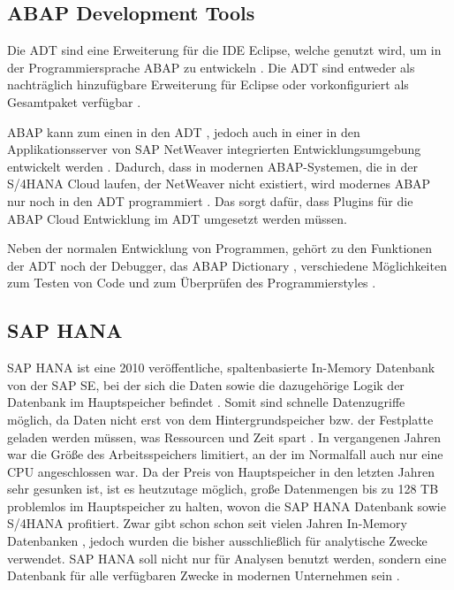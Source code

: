 \subsection{ABAP Development Tools}
Die \ac{ADT} sind eine Erweiterung für die \ac{IDE} Eclipse, welche genutzt wird, um in der Programmiersprache ABAP zu entwickeln \cite[S. 21]{sap_installing_2022}. Die \ac{ADT} sind entweder als nachträglich hinzufügbare Erweiterung für Eclipse oder vorkonfiguriert als Gesamtpaket verfügbar \cite{sap_sap_nodate}. 

\ac{ABAP} kann zum einen in den \ac{ADT} \cite[S. 1ff.]{pegiel_abap_2021}, jedoch auch in einer in den Applikationsserver von SAP NetWeaver integrierten Entwicklungsumgebung entwickelt werden \cite[S. 26]{keller_abap_2006} \cite{sap_development_nodate}. Dadurch, dass in modernen ABAP-Systemen, die in der S/4HANA Cloud laufen, der NetWeaver nicht existiert, wird modernes ABAP nur noch in den \ac{ADT} programmiert \cite{sap_abap_nodate-2}. Das sorgt dafür, dass Plugins für die ABAP Cloud Entwicklung im ADT umgesetzt werden müssen. 

Neben der normalen Entwicklung von Programmen, gehört zu den Funktionen der \ac{ADT} noch der Debugger, das ABAP Dictionary \cite[S. 1/2-1/6]{sap-documentation_abap4_1996-1}, verschiedene Möglichkeiten zum Testen von Code \cite[S. 89ff.]{pegiel_abap_2021} \cite{sap_abap_nodate-1} und zum Überprüfen des Programmierstyles \cite[S. 357ff.]{blumenthal_abap_2005}. 

\subsection{SAP HANA}
SAP HANA ist eine 2010 veröffentliche, spaltenbasierte In-Memory Datenbank von der SAP SE, bei der sich die Daten sowie die dazugehörige Logik der Datenbank im Hauptspeicher befindet \cite[S. 5 ff.]{sap_ha100_2022}. Somit sind schnelle Datenzugriffe möglich, da Daten nicht erst von dem Hintergrundspeicher bzw. der Festplatte geladen werden müssen, was Ressourcen und Zeit spart \cite[S. 7 ff.]{plattner_course_2013}. In vergangenen Jahren war die Größe des Arbeitsspeichers limitiert, an der im Normalfall auch nur eine CPU angeschlossen war. Da der Preis von Hauptspeicher in den letzten Jahren sehr gesunken ist, ist es heutzutage möglich, große Datenmengen bis zu 128 TB \cite[S. 5]{sap_ha100_2022} problemlos im Hauptspeicher zu halten, wovon die SAP HANA Datenbank sowie S/4HANA profitiert. Zwar gibt schon schon seit vielen Jahren In-Memory Datenbanken \cite[53]{hector_main_1992}, jedoch wurden die bisher ausschließlich für analytische Zwecke verwendet. SAP HANA soll nicht nur für Analysen benutzt werden, sondern eine Datenbank für alle verfügbaren Zwecke in modernen Unternehmen sein \cite[S. 43 ff.]{plattner_-memory_2011}.

